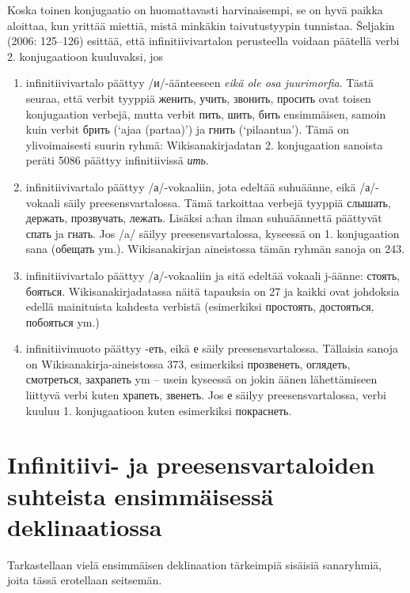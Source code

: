 \documentclass[]{scrreprt}
\providecommand{\tightlist}{%
  \setlength{\itemsep}{0pt}\setlength{\parskip}{0pt}}
\begin{document}
Koska toinen konjugaatio on huomattavasti harvinaisempi, se on hyvä
paikka aloittaa, kun yrittää miettiä, mistä minkäkin taivutustyypin
tunnistaa. Šeljakin (2006: 125--126) esittää, että infinitiivivartalon
perusteella voidaan päätellä verbi 2. konjugaatioon kuuluvaksi, jos

\begin{enumerate}
\def\labelenumi{\arabic{enumi}.}
\tightlist
\item
  infinitiivivartalo päättyy /и/-äänteeseen \emph{eikä ole osa
  juurimorfia}. Tästä seuraa, että verbit tyyppiä женить, учить,
  звонить, просить ovat toisen konjugaation verbejä, mutta verbit пить,
  шить, бить ensimmäisen, samoin kuin verbit брить (`ajaa (partaa)') ja
  гнить (`pilaantua'). Tämä on ylivoimaisesti suurin ryhmä:
  Wikisanakirjadatan 2. konjugaation sanoista peräti 5086 päättyy
  infinitiivissä \emph{ить}.
\item
  infinitiivivartalo päättyy /а/-vokaaliin, jota edeltää suhuäänne, eikä
  /а/-vokaali säily preesensvartalossa. Tämä tarkoittaa verbejä tyyppiä
  слышать, держать, прозвучать, лежать. Lisäksi a:han ilman suhuäännettä
  päättyvät спать ja гнать. Jos /a/ säilyy preesensvartalossa, kyseessä
  on 1. konjugaation sana (обещать ym.). Wikisanakirjan aineistossa
  tämän ryhmän sanoja on 243.
\item
  infinitiivivartalo päättyy /а/-vokaaliin ja sitä edeltää vokaali
  j-äänne: стоять, бояться. Wikisanakirjadatassa näitä tapauksia on 27
  ja kaikki ovat johdoksia edellä mainituista kahdesta verbistä
  (esimerkiksi простоять, достояться, побояться ym.)
\item
  infinitiivimuoto päättyy -еть, eikä е säily preesensvartalossa.
  Tällaisia sanoja on Wikisanakirja-aineistossa 373, esimerkiksi
  прозвенеть, оглядеть, смотреться, захрапеть ym -- usein kyseessä on
  jokin äänen lähettämiseen liittyvä verbi kuten храпеть, звенеть. Jos е
  säilyy preesensvartalossa, verbi kuuluu 1. konjugaatioon kuten
  esimerkiksi покраснеть.
\end{enumerate}

\section{Infinitiivi- ja preesensvartaloiden suhteista ensimmäisessä
deklinaatiossa}\label{infinitiivi--ja-preesensvartaloiden-suhteista-ensimmuxe4isessuxe4-deklinaatiossa}

Tarkastellaan vielä ensimmäisen deklinaation tärkeimpiä sisäisiä
sanaryhmiä, joita tässä erotellaan seitsemän.
\end{document}
